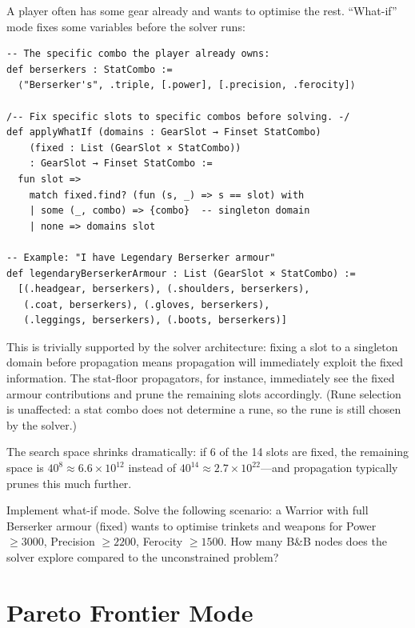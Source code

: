 \documentclass[11pt, a4paper, oneside]{book}
\begin{document}
A player often has some gear already and wants to optimise the rest.
``What-if'' mode fixes some variables before the solver runs:

\begin{leanbox}[title={Lean 4 (Mathlib) --- What-If Mode}]
\begin{verbatim}
-- The specific combo the player already owns:
def berserkers : StatCombo :=
  ⟨"Berserker's", .triple, [.power], [.precision, .ferocity]⟩

/-- Fix specific slots to specific combos before solving. -/
def applyWhatIf (domains : GearSlot → Finset StatCombo)
    (fixed : List (GearSlot × StatCombo))
    : GearSlot → Finset StatCombo :=
  fun slot =>
    match fixed.find? (fun (s, _) => s == slot) with
    | some (_, combo) => {combo}  -- singleton domain
    | none => domains slot

-- Example: "I have Legendary Berserker armour"
def legendaryBerserkerArmour : List (GearSlot × StatCombo) :=
  [(.headgear, berserkers), (.shoulders, berserkers),
   (.coat, berserkers), (.gloves, berserkers),
   (.leggings, berserkers), (.boots, berserkers)]
\end{verbatim}
\end{leanbox}

This is trivially supported by the solver architecture: fixing a slot to a
singleton domain before propagation means propagation will immediately
exploit the fixed information.  The stat-floor propagators, for instance,
immediately see the fixed armour contributions and prune the remaining slots
accordingly.  (Rune selection is unaffected: a stat combo does not determine
a rune, so the rune is still chosen by the solver.)

The search space shrinks dramatically: if 6 of the 14 slots are fixed, the
remaining space is $40^{8} \approx 6.6 \times 10^{12}$ instead of $40^{14}
\approx 2.7 \times 10^{22}$---and propagation typically prunes this much further.

\begin{exercisebox}
Implement what-if mode.  Solve the following scenario: a Warrior with full
Berserker armour (fixed) wants to optimise trinkets and weapons for
Power $\geq 3000$, Precision $\geq 2200$, Ferocity $\geq 1500$.  How many
B\&B nodes does the solver explore compared to the unconstrained problem?
\end{exercisebox}

\section{Pareto Frontier Mode}
\end{document}
